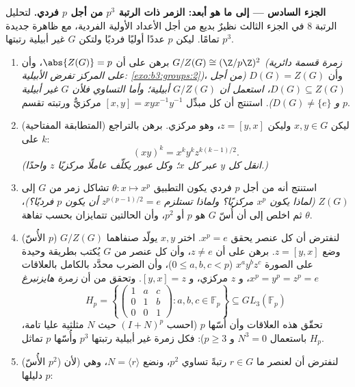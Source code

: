 \begin{problem}
\medskip
\noindent\textbf{الجزء السادس --- إلى ما هو أبعد: الزمر ذات
الرتبة $p^3$ من أجل $p$ فردي.} لتحليل الرتبة $8$ في الجزء الثالث
نظيرٌ بديع من أجل الأعداد الأولية الفردية، مع ظاهرة جديدة تمامًا.
ليكن $p$ عددًا أوليًا فرديًا ولتكن $G$ غير أبيلية رتبتها $p^3$.
\begin{enumerate}[resume]
  \item برهن على أن $\abs{Z(G)} = p$، وأن $G/Z(G) \cong
        (\Z/p\Z)^2$ \emph{(زمرة
        قسمة دائرية على المركز تفرض الأبيلية: \cref{exo:b3:groups:2})}،
        وأن $D(G) =
        Z(G)$ \emph{(من أجل $D(G) \subseteq Z(G)$، استعمل أن $G/Z(G)$
        أبيلية؛ وأما التساوي فلأن $G$ غير أبيلية و $D(G) \neq \{e\}$)}.
        استنتج أن كل مبدِّل $[x, y] = xyx^{-1}y^{-1}$ مركزيٌّ ورتبته تقسم $p$.
  \item (المتطابقة المفتاحية) ليكن $x, y \in G$ وليكن
        $z = [y, x]$، وهو مركزي. برهن بالتراجع على $k$:
        \[
        (xy)^k = x^k y^k z^{k(k-1)/2} .
        \]
        \emph{(انقل كل $y$ عبر كل $x$؛ وكل عبور يكلّف عاملًا
        مركزيًا $z$ واحدًا.)}
  \item استنتج أنه من أجل $p$ فردي يكون التطبيق $\theta\colon x \mapsto
        x^p$ تشاكل
        زمر من $G$ إلى $Z(G)$ \emph{(لماذا يكون $x^p$ مركزيًا؟
        ولماذا تستلزم $z^{p(p-1)/2} = e$ أن يكون $p$ فرديًا؟)}، ثم اخلص إلى
        أن أُسّ $G$ هو $p$ أو $p^2$، وأن الحالتين تتمايزان بحسب
        تفاهة $\theta$.
  \item (الأُسّ $p$) لنفترض أن كل عنصر يحقق $x^p = e$. اختر
        $x, y$ يولّد صنفاهما $G/Z(G)$ وضع $z =
        [y, x]$. برهن على أن
        $z \neq e$، وأن كل عنصر من $G$ يُكتب بطريقة وحيدة على
        الصورة $x^ay^bz^c$ ($0 \leq a, b, c < p$)، وأن الضرب محدَّد بالكامل
        بالعلاقات $x^p = y^p = z^p = e$، و $z$ مركزي، و $[y, x] =
        z$. وتحقق من أن
        \emph{زمرة هايزنبرغ}
        \[
        H_p = \left\{
        \begin{pmatrix} 1 & a & c\\ 0 & 1 & b\\ 0 & 0 & 1
        \end{pmatrix} : a, b, c \in \mathbb F_p \right\}
        \subseteq GL_3(\mathbb F_p)
        \]
        تحقّق هذه العلاقات وأن أُسّها $p$ (احسب $(I + N)^p$ حيث
        $N$ مثلثية عليا تامة، باستعمال $N^3 = 0$ و $p \geq 3$):
        فكل زمرة غير أبيلية رتبتها $p^3$ وأُسّها $p$ تماثل
        $H_p$.
  \item (الأُسّ $p^2$) لنفترض أن لعنصر ما $r \in G$ رتبةً تساوي
        $p^2$، ونضع $N = \langle r\rangle$، وهي  (لأن دليلها $p$:

\end{enumerate}
\end{problem}

